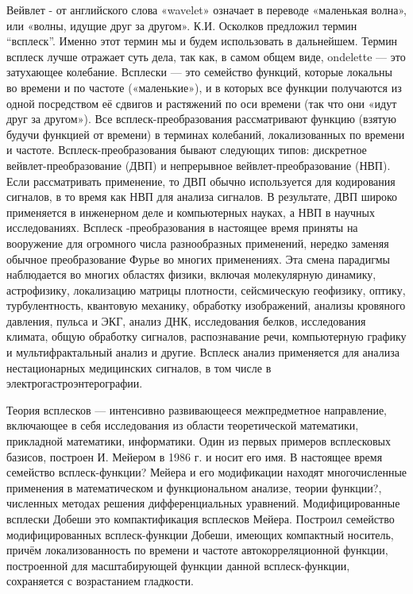 





\vzmscaption

Вейвлет - от английского слова «wavelet» означает в переводе «маленькая волна», или «волны, идущие друг за другом». К.И. Осколков предложил термин “всплеск”. Именно этот термин мы и будем использовать в дальнейшем. Термин всплеск лучше отражает суть дела, так как, в самом общем виде, ondelette — это затухающее колебание.
Всплески — это семейство функций, которые локальны во времени и по частоте («маленькие»), и в которых все функции получаются из одной посредством её сдвигов и растяжений по оси времени (так что они «идут друг за другом»).
Все всплеск-преобразования рассматривают функцию (взятую будучи функцией от времени) в терминах колебаний, локализованных по времени и частоте. Всплеск-преобразования бывают следующих типов: дискретное вейвлет-преобразование (ДВП) и непрерывное вейвлет-преобразование (НВП).
Если рассматривать применение, то ДВП обычно используется для кодирования сигналов, в то время как НВП для анализа сигналов. В результате, ДВП широко применяется в инженерном деле и компьютерных науках, а НВП в научных исследованиях. Всплеск -преобразования в настоящее время приняты на вооружение для огромного числа разнообразных применений, нередко заменяя обычное преобразование Фурье во многих применениях. Эта смена парадигмы наблюдается во многих областях физики, включая молекулярную динамику, астрофизику, локализацию матрицы плотности, сейсмическую геофизику, оптику, турбулентность, квантовую механику, обработку изображений, анализы кровяного давления, пульса и ЭКГ, анализ ДНК, исследования белков, исследования климата, общую обработку сигналов, распознавание речи, компьютерную графику и мультифрактальный анализ и другие. Всплеск анализ применяется для анализа нестационарных медицинских сигналов, в том числе в электрогастроэнтерографии.

Теория всплесков — интенсивно развивающееся межпредметное направление, включающее в себя исследования из области теоретической математики, прикладной математики, информатики. Один из первых примеров всплесковых базисов, построен И. Мейером в 1986 г. и носит его имя. В настоящее время семейство всплеск-функции? Мейера и его модификации находят многочисленные применения в математическом и функциональном анализе, теории функции?, численных методах решения дифференциальных уравнений.
Модифицированные всплески Добеши это компактификация всплесков Мейера.
Построил семейство модифицированных всплеск-функции Добеши, имеющих компактный носитель, причём локализованность по времени и частоте автокорреляционной функции, построенной для масштабирующей функции данной всплеск-функции, сохраняется с возрастанием гладкости.
